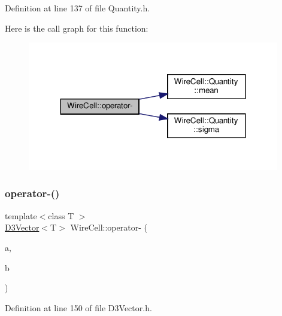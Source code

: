 Definition at line 137 of file Quantity.\+h.

Here is the call graph for this function\+:
\nopagebreak
\begin{figure}[H]
\begin{center}
\leavevmode
\includegraphics[width=311pt]{namespace_wire_cell_ad9e6366de8387b1bac5e86f5934ab7ba_cgraph}
\end{center}
\end{figure}
\mbox{\label{namespace_wire_cell_a2fcfbe1421246fe979a5adfd4e7ee96a}} 
\subsubsection{\texorpdfstring{operator-\/()}{operator-()}\hspace{0.1cm}{\footnotesize\ttfamily [2/3]}}
{\footnotesize\ttfamily template$<$class T $>$ \\
\hyperlink{class_wire_cell_1_1_d3_vector}{D3\+Vector}$<$T$>$ Wire\+Cell\+::operator-\/ (\begin{DoxyParamCaption}\item[{const \hyperlink{class_wire_cell_1_1_d3_vector}{D3\+Vector}$<$ T $>$}]{a,  }\item[{const \hyperlink{class_wire_cell_1_1_d3_vector}{D3\+Vector}$<$ T $>$}]{b }\end{DoxyParamCaption})}



Definition at line 150 of file D3\+Vector.\+h.

